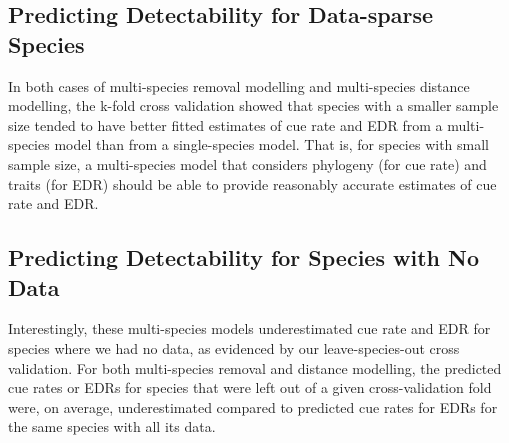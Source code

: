 \documentclass[12pt]{article}
\begin{document}
\subsection{Predicting Detectability for Data-sparse Species}

\par In both cases of multi-species removal modelling and multi-species distance modelling, the k-fold cross validation showed that species with a smaller sample size tended to have better fitted estimates of cue rate and EDR from a multi-species model than from a single-species model.
That is, for species with small sample size, a multi-species model that considers phylogeny (for cue rate) and traits (for EDR) should be able to provide reasonably accurate estimates of cue rate and EDR.

\subsection{Predicting Detectability for Species with No Data}\label{discussion-nodata}

\par Interestingly, these multi-species models underestimated cue rate and EDR for species where we had no data, as evidenced by our leave-species-out cross validation.
For both multi-species removal and distance modelling, the predicted cue rates or EDRs for species that were left out of a given cross-validation fold were, on average, underestimated compared to predicted cue rates for EDRs for the same species with all its data.
\end{document}
